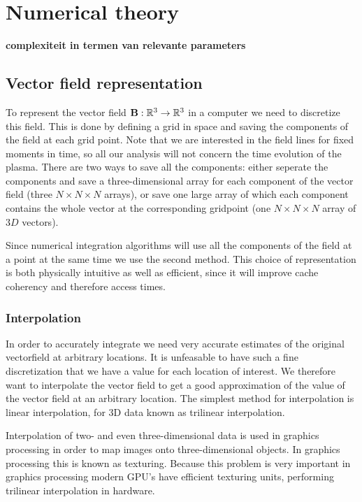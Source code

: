 \documentclass{article}
\renewcommand{\vec}{\bold}
\begin{document}
\section{Numerical theory}
{\bf complexiteit in termen van relevante parameters}
\subsection{Vector field representation}
To represent the vector field $\vec{B}: \mathbb{R}^3 \to \mathbb{R}^3$ in a computer we need to discretize this field. This is done by defining a grid in space and saving the components of the field at each grid point. Note that we are interested in the field lines for fixed moments in time, so all our analysis will not concern the time evolution of the plasma. There are two ways to save all the components: either seperate the components and save a three-dimensional array for each component of the vector field (three $N\times N\times N$ arrays), or save one large array of which each component contains the whole vector at the corresponding gridpoint (one $N\times N\times N$ array of $3D$ vectors).

Since numerical integration algorithms will use all the components of the field at a point at the same time we use the second method. %
This choice of representation is both physically intuitive as well as efficient, since it will improve cache coherency and therefore access times.

\subsubsection{Interpolation}
In order to accurately integrate we need very accurate estimates of the original vectorfield at arbitrary locations. It is unfeasable to have such a fine discretization that we have a value for each location of interest. We therefore want to interpolate the vector field to get a good approximation of the value of the vector field at an arbitrary location. The simplest method for interpolation is linear interpolation, for 3D data known as trilinear interpolation.

Interpolation of two- and even three-dimensional data is used in graphics processing in order to map images onto three-dimensional objects. In graphics processing this is known as texturing. Because this problem is very important in graphics processing modern GPU's have efficient texturing units, performing trilinear interpolation in hardware.
\end{document}
